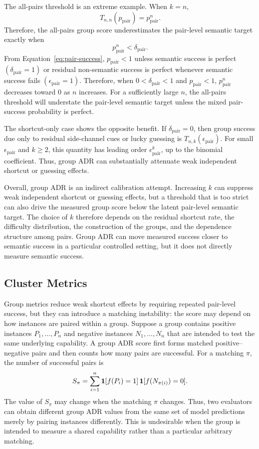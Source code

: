 \documentclass[acmsmall,screen,review,anonymous]{acmart}
\begin{document}
The all-pairs threshold is an extreme example. When \(k=n\),
\[
T_{n,n}(p_{\mathrm{pair}})
=
p_{\mathrm{pair}}^n.
\]
Therefore, the all-pairs group score underestimates the pair-level semantic
target exactly when
\[
p_{\mathrm{pair}}^n
<
\delta_{\mathrm{pair}}.
\]
From Equation~\eqref{eq:pair-success}, \(p_{\mathrm{pair}}<1\) unless
semantic success is perfect \((\delta_{\mathrm{pair}}=1)\) or residual
non-semantic success is perfect whenever semantic success fails
\((\epsilon_{\mathrm{pair}}=1)\). Therefore, when
\(0<\delta_{\mathrm{pair}}<1\) and \(p_{\mathrm{pair}}<1\),
\(p_{\mathrm{pair}}^n\) decreases toward \(0\) as \(n\) increases. For a
sufficiently large \(n\), the all-pairs threshold will understate the
pair-level semantic target unless the mixed pair-success probability is
perfect.

The shortcut-only case shows the opposite benefit. If
\(\delta_{\mathrm{pair}}=0\), then group success due only to residual
side-channel cues or lucky guessing is \(T_{n,k}(\epsilon_{\mathrm{pair}})\).
For small \(\epsilon_{\mathrm{pair}}\) and \(k\ge 2\), this quantity has
leading order \(\epsilon_{\mathrm{pair}}^k\), up to the binomial coefficient.
Thus, group ADR can substantially attenuate weak independent shortcut or
guessing effects.

Overall, group ADR is an indirect calibration attempt. Increasing \(k\) can
suppress weak independent shortcut or guessing effects, but a threshold that
is too strict can also drive the measured group score below the latent
pair-level semantic target. The choice of \(k\) therefore depends on the
residual shortcut rate, the difficulty distribution, the construction of the
groups, and the dependence structure among pairs. Group ADR can move measured
success closer to semantic success in a particular controlled setting, but it
does not directly measure semantic success.

\subsection{Cluster Metrics}
\label{sec:controlled-metrics:cluster}

Group metrics reduce weak shortcut effects by requiring repeated pair-level
success, but they can introduce a matching instability: the score may depend
on how instances are paired within a group. Suppose a group contains
positive instances \(P_1,\ldots,P_n\) and negative instances
\(N_1,\ldots,N_n\) that are intended to test the same underlying capability.
A group ADR score first forms matched positive--negative pairs and then
counts how many pairs are successful. For a matching \(\pi\), the number of
successful pairs is
\[
S_{\pi}
=
\sum_{i=1}^{n}
\mathbf{1}[f(P_i)=1]\,
\mathbf{1}[f(N_{\pi(i)})=0].
\]
The value of \(S_{\pi}\) may change when the matching \(\pi\) changes. Thus,
two evaluators can obtain different group ADR values from the same set of
model predictions merely by pairing instances differently. This is
undesirable when the group is intended to measure a shared capability rather
than a particular arbitrary matching.
\end{document}
